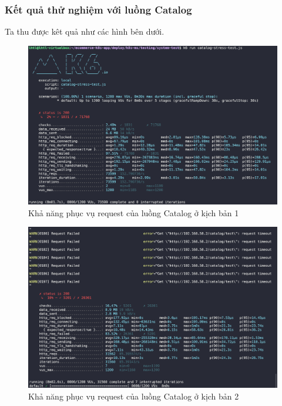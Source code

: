 \subsubsection{Kết quả thử nghiệm với luồng Catalog}
\noindent Ta thu được kêt quả như các hình bên dưới.
\begin{figure}[H]
  \begin{center}
      \includegraphics[scale = 0.65]{images/hanh/fullflow-test/full-flow-catalog-no-hpa}
      \vspace*{1mm}
  \end{center}
  \caption{Khả năng phục vụ request của luồng Catalog ở kịch bản 1}
  \label{fig:fullflow-catalog-no-hpa}

\end{figure}
\begin{figure}[H]
  \begin{center}
      \includegraphics[scale = 0.65]{images/hanh/fullflow-test/full-flow-catalog-with-hpa}
      \vspace*{1mm}
  \end{center}
  \caption{Khả năng phục vụ request của luồng Catalog ở kịch bản 2}
  \label{fig:fullflow-catalog-with-hpa}

\end{figure}
